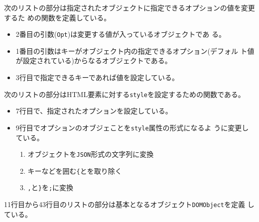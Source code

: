 次のリストの部分は指定されたオブジェクトに指定できるオプションの値を変更するた
 めの関数を定義している。
\begin{itemize}
 \item 2番目の引数(\texttt{Opt})は変更する値が入っているオブジェクトであ
       る。
 \item 1番目の引数はキーがオブジェクト内の指定できるオプション(デフォル
       ト値が設定されている)からなるオブジェクトである。
 \item 3行目で指定できるキーであれば値を設定している。
\end{itemize}
次のリストの部分はHTML要素に対する\texttt{style}を設定するための関数である。
\begin{itemize}
 \item 7行目で、指定されたオプションを設定している。
 \item 9行目でオプションのオブジェことを\texttt{style}属性の形式になるよ
       うに変更している。
\begin{enumerate}
 \item オブジェクトを\texttt{JSON}形式の文字列に変換
 \item キーなどを囲む\texttt{\{}と\texttt{\"}を取り除く
 \item \texttt{,}と\texttt{\}}を\texttt{;}に変換
\end{enumerate}
\end{itemize}
11行目から43行目のリストの部分は基本となるオブジェクト\texttt{DOMObject}を定義
している。
